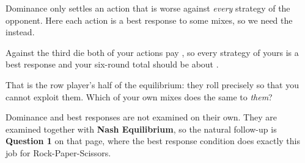 \vspace{1.2cm}

{\large Dominance only settles an action that is worse against \emph{every}
strategy of the opponent. Here each action is a best response to some mixes, so
we need the  instead.}

\vspace{1cm}

\begin{center}
\end{center}

\newpage
{}

\vspace{0.8cm}

{\large Against the third die both of your actions pay
, so every strategy of yours is a best response and
your six-round total should be about .}

\vspace{1.1cm}

{\large That is the row player's half of the equilibrium: they roll precisely
so that you cannot exploit them. Which of your own mixes does the same to
\emph{them}?}

\vspace{0.9cm}

\begin{center}
\end{center}

\newpage
{}

\vspace{0.9cm}

{\large Dominance and best responses are not examined on their own. They are
examined together with \textbf{Nash Equilibrium}, so the natural follow-up is
\textbf{Question 1} on that page, where the best response condition does exactly
this job for Rock-Paper-Scissors.}

